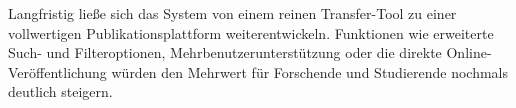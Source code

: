 \noindent Langfristig ließe sich das System von einem reinen Transfer-Tool zu einer 
vollwertigen Publikationsplattform weiterentwickeln. Funktionen wie erweiterte 
Such- und Filteroptionen, Mehrbenutzerunterstützung oder die direkte 
Online-Veröffentlichung würden den Mehrwert für Forschende und Studierende 
nochmals deutlich steigern.
